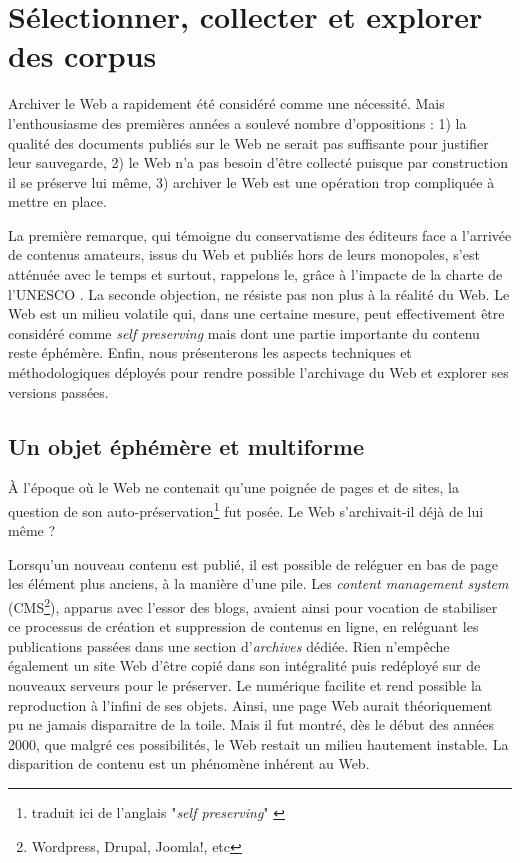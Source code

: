 \documentclass[symmetric,justified,marginals=raggedouter]{tufte-book}
\begin{document}
\section{Sélectionner, collecter et explorer des corpus}
\label{sec:3_constituer}

\noindent Archiver le Web a rapidement été considéré comme une nécessité. Mais l'enthousiasme des premières années a soulevé nombre d'opposi\-tions \citep{masanes_web_2006} : 1) la qualité des documents publiés sur le Web ne serait pas suffisante pour justifier leur sauvegarde, 2) le Web n'a pas besoin d'être collecté puisque par construction il se préserve lui même, 3) archiver le Web est une opération trop compliquée à mettre en place. 

La première remarque, qui témoigne du conservatisme des éditeurs face a l'arrivée de contenus amateurs, issus du Web et publiés hors de leurs monopoles, s'est atténuée avec le temps et surtout, rappelons le, grâce à l'impacte de la charte de l'UNESCO \citep{unesco_charter_2003}. La seconde objection, ne résiste pas non plus à la réalité du Web. Le Web est un milieu volatile qui, dans une certaine mesure, peut effectivement être considéré comme \textit{self preserving} mais dont une partie importante du contenu reste éphémère. Enfin, nous présenterons les aspects techniques et méthodologiques déployés pour rendre possible l'archivage du Web et explorer ses versions passées.

\subsection{Un objet éphémère et multiforme}  
 
\noindent À l'époque où le Web ne contenait qu'une poignée de pages et de sites, la question de son auto-préservation\footnote{traduit ici de l'anglais "\textit{self preserving}" \citep{spinellis_decay_2003}} fut posée. Le Web s'archivait-il déjà de lui même ? 

Lorsqu'un nouveau contenu est publié, il est possible de reléguer en bas de page les élément plus anciens, à la manière d'une pile. Les \textit{content management system} (CMS\footnote{Wordpress, Drupal, Joomla!, etc}), apparus avec l'essor des blogs, avaient ainsi pour vocation de stabiliser ce processus de création et suppression de contenus en ligne, en reléguant les publications passées dans une section d'\textit{archives} dédiée. Rien n'empêche également un site Web d'être copié dans son intégralité puis redéployé sur de nouveaux serveurs pour le préserver. Le numérique facilite et rend possible la reproduction à l'infini de ses objets. Ainsi, une page Web aurait théoriquement pu ne jamais disparaitre de la toile. Mais il fut montré, dès le début des années 2000, que malgré ces possibilités, le Web restait un milieu hautement instable. La disparition de contenu est un phénomène inhérent au Web. 
\end{document}
